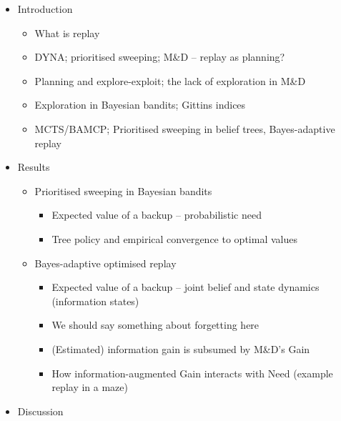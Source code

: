 \documentclass[11pt]{article} %
\begin{document}
\begin{itemize}
   \item Introduction
   \begin{itemize}
      \item What is replay
      \item DYNA; prioritised sweeping; M\&D -- replay as planning?
      \item Planning and explore-exploit; the lack of exploration in M\&D
      \item Exploration in Bayesian bandits; Gittins indices
      \item MCTS/BAMCP; Prioritised sweeping in belief trees, Bayes-adaptive replay
   \end{itemize}
   \item Results
   \begin{itemize}
      \item Prioritised sweeping in Bayesian bandits
      \begin{itemize}
         \item Expected value of a backup -- probabilistic need
         \item Tree policy and empirical convergence to optimal values
      \end{itemize}
      \item Bayes-adaptive optimised replay
      \begin{itemize}
         \item Expected value of a backup -- joint belief and state dynamics (information states)
         \item We should say something about forgetting here
         \item (Estimated) information gain is subsumed by M\&D's Gain
         \item How information-augmented Gain interacts with Need (example replay in a maze) 
      \end{itemize}
   \end{itemize}
   \item Discussion
\end{itemize}
\end{document}
